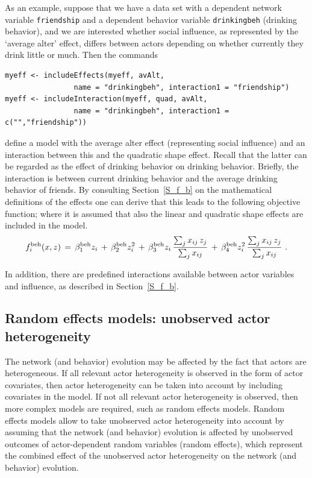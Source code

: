 \documentclass[a4paper,fleqn,11pt]{article}
\newcommand{\+}{\, + \,}
\begin{document}
As an example, suppose that we have a data set with a dependent
network variable \texttt{friendship} and a dependent behavior variable
\texttt{drinkingbeh} (drinking behavior), and we are interested whether
social influence, as represented by the `average alter' effect, differs
between actors depending on whether currently they drink little or much.
Then the commands
\begin{verbatim}
myeff <- includeEffects(myeff, avAlt,
                name = "drinkingbeh", interaction1 = "friendship")
myeff <- includeInteraction(myeff, quad, avAlt,
                name = "drinkingbeh", interaction1 = c("","friendship"))
\end{verbatim}
define a model with the average alter effect (representing social influence)
and an interaction between this and the quadratic shape effect.
Recall that the latter can be regarded
as the effect of drinking behavior on drinking behavior.
Briefly, the interaction is between current drinking behavior
and the average drinking behavior of friends.
By consulting Section~\ref{S_f_b} on the mathematical definitions of the
effects one can derive that this leads to the following objective function;
where it is assumed that also the linear and quadratic shape effects are
included in the model.
\[
f^{\rm beh}_i(x, z) \,=\, \beta^{\rm beh}_1 z_i \,+\, \beta^{\rm beh}_2 z_i^2
        \,+\, \beta^{\rm beh}_3 z_i \,
        \frac{ \sum_j x_{ij}\, z_j }{\sum_j x_{ij}}
       \,+\, \beta^{\rm beh}_4 z_i^2 \,
              \frac{ \sum_j x_{ij}\, z_j }{\sum_j x_{ij}} \ .
\]
\medskip

In addition, there are predefined interactions available
between actor variables and influence, as described in Section~\ref{S_f_b}.

\iffalse
\subsection{Random effects models: unobserved actor heterogeneity}

The network (and behavior) evolution may be affected
by the fact that actors are heterogeneous.
If all relevant actor heterogeneity is observed in the form of actor
covariates,
then actor heterogeneity can be taken into account by including
covariates in the model.
If not all relevant actor heterogeneity is observed,
then more complex models are required, such as random effects models.
Random effects models \citep[see][]{SchweinbergerSnijders07b} allow to take
unobserved actor heterogeneity into account
by assuming that the network (and behavior) evolution is affected
by unobserved
outcomes of actor-dependent random variables (random effects),
which represent the combined effect of the unobserved actor
heterogeneity on the network (and behavior) evolution.
\end{document}
